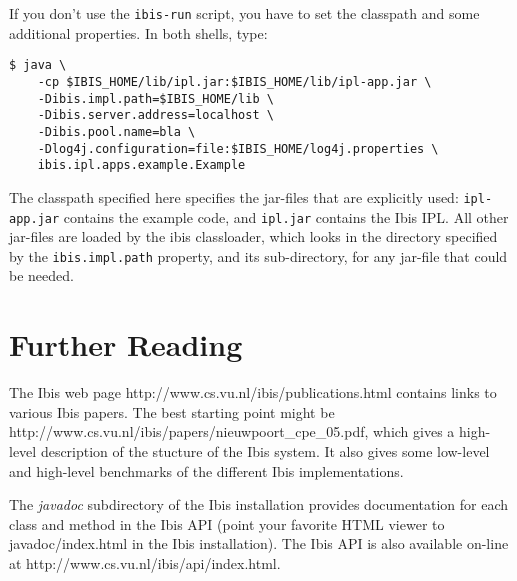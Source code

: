 \documentclass[10pt]{article}
\newcommand{\mysection}[1]{\section{#1}\label{#1}}
\begin{document}
If you don't use the \texttt{ibis-run} script, you have to set the classpath
and some additional properties. In both shells, type:

\noindent
{\small
\begin{verbatim}
$ java \
    -cp $IBIS_HOME/lib/ipl.jar:$IBIS_HOME/lib/ipl-app.jar \
    -Dibis.impl.path=$IBIS_HOME/lib \
    -Dibis.server.address=localhost \
    -Dibis.pool.name=bla \
    -Dlog4j.configuration=file:$IBIS_HOME/log4j.properties \
    ibis.ipl.apps.example.Example
\end{verbatim}
}
\noindent
The classpath specified here specifies the jar-files that are explicitly used:
\texttt{ipl-app.jar} contains the example code, and \texttt{ipl.jar} contains
the Ibis IPL. All other jar-files are loaded by the ibis classloader, which
looks in the directory specified by the \texttt{ibis.impl.path} property,
and its sub-directory, for any jar-file that could be needed.

\mysection{Further Reading}

The Ibis web page http://www.cs.vu.nl/ibis/publications.html
contains links to various Ibis papers.
The best starting point might be \\
http://www.cs.vu.nl/ibis/papers/nieuwpoort\_cpe\_05.pdf,
which gives a high-level description of the stucture of the Ibis system.
It also gives some low-level and high-level benchmarks of the different Ibis implementations.

The \emph{javadoc} subdirectory of the Ibis installation provides
documentation for each class and method in the Ibis API (point your favorite
HTML viewer to javadoc/index.html in the Ibis installation).
The Ibis API is also available on-line at http://www.cs.vu.nl/ibis/api/index.html.
\end{document}
